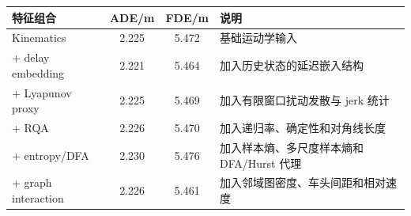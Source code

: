 \begin{tabularx}{\textwidth}{lccX}
\toprule
特征组合 & ADE/m & FDE/m & 说明 \\ 
\midrule
Kinematics & 2.225 & 5.472 & 基础运动学输入 \\ 
+ delay embedding & 2.221 & 5.464 & 加入历史状态的延迟嵌入结构 \\ 
+ Lyapunov proxy & 2.225 & 5.469 & 加入有限窗口扰动发散与 jerk 统计 \\ 
+ RQA & 2.226 & 5.470 & 加入递归率、确定性和对角线长度 \\ 
+ entropy/DFA & 2.230 & 5.476 & 加入样本熵、多尺度样本熵和 DFA/Hurst 代理 \\ 
+ graph interaction & 2.226 & 5.461 & 加入邻域图密度、车头间距和相对速度 \\ 
\bottomrule
\end{tabularx}
